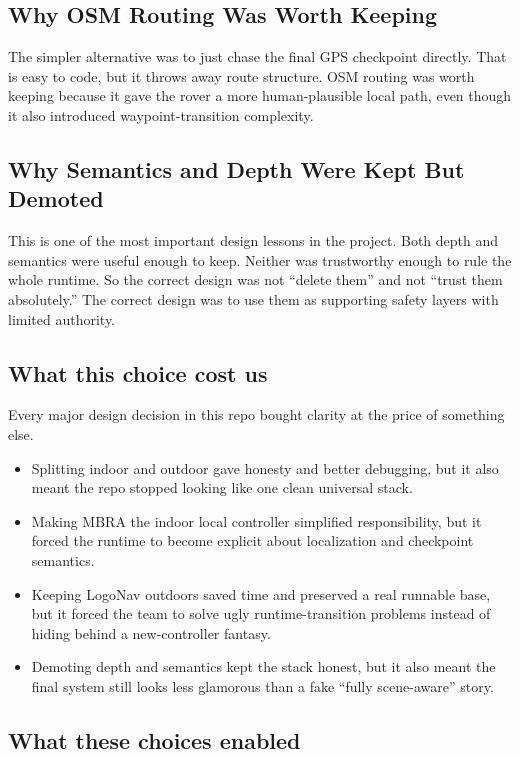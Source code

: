 \documentclass[11pt]{article}
\begin{document}
\subsection{Why OSM Routing Was Worth Keeping}

The simpler alternative was to just chase the final GPS checkpoint directly. That is
easy to code, but it throws away route structure. OSM routing was worth keeping
because it gave the rover a more human-plausible local path, even though it also
introduced waypoint-transition complexity.

\subsection{Why Semantics and Depth Were Kept But Demoted}

This is one of the most important design lessons in the project. Both depth and
semantics were useful enough to keep. Neither was trustworthy enough to rule the
whole runtime. So the correct design was not ``delete them'' and not ``trust them
absolutely.'' The correct design was to use them as supporting safety layers with
limited authority.

\subsection{What this choice cost us}

Every major design decision in this repo bought clarity at the price of something
else.

\begin{itemize}[nosep]
  \item Splitting indoor and outdoor gave honesty and better debugging, but it also
  meant the repo stopped looking like one clean universal stack.
  \item Making MBRA the indoor local controller simplified responsibility, but it
  forced the runtime to become explicit about localization and checkpoint semantics.
  \item Keeping LogoNav outdoors saved time and preserved a real runnable base, but
  it forced the team to solve ugly runtime-transition problems instead of hiding
  behind a new-controller fantasy.
  \item Demoting depth and semantics kept the stack honest, but it also meant the
  final system still looks less glamorous than a fake ``fully scene-aware'' story.
\end{itemize}

\subsection{What these choices enabled}
\end{document}
